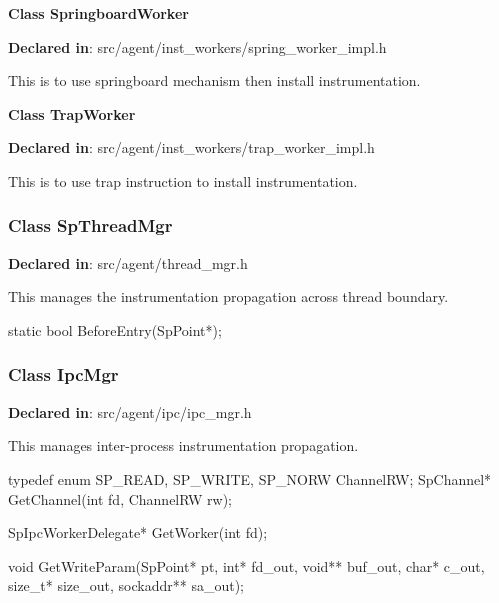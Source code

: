 \textbf{Class SpringboardWorker}

\textbf{Declared in}: src/agent/inst\_workers/spring\_worker\_impl.h

This is to use springboard mechanism then install instrumentation.

\textbf{Class TrapWorker}

\textbf{Declared in}: src/agent/inst\_workers/trap\_worker\_impl.h

This is to use trap instruction to install instrumentation.

\subsubsection{Class SpThreadMgr}
\textbf{Declared in}: src/agent/thread\_mgr.h

This manages the instrumentation propagation across thread boundary.

\begin{apient}
static bool BeforeEntry(SpPoint*);
\end{apient}

\subsubsection{Class IpcMgr}
\textbf{Declared in}: src/agent/ipc/ipc\_mgr.h

This manages inter-process instrumentation propagation.

\begin{apient}
typedef enum {
  SP_READ,
  SP_WRITE,
  SP_NORW
} ChannelRW;
SpChannel* GetChannel(int fd,
                      ChannelRW rw);
\end{apient}

\begin{apient}
SpIpcWorkerDelegate* GetWorker(int fd);
\end{apient}

\begin{apient}
void GetWriteParam(SpPoint* pt,
                   int* fd_out,
                   void** buf_out,
                   char* c_out,
                   size_t* size_out,
                   sockaddr** sa_out);
\end{apient}

